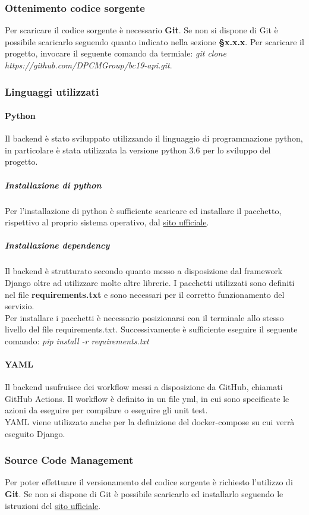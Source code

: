 \subsubsection{Ottenimento codice sorgente}
Per scaricare il codice sorgente è necessario \textbf{Git}. Se non si dispone di Git è possibile scaricarlo seguendo quanto indicato nella sezione \textbf{§x.x.x}. Per scaricare il progetto, invocare il seguente comando da termiale: \textit{git clone https://github.com/DPCMGroup/bc19-api.git}.

\subsubsection{Linguaggi utilizzati}
\paragraph{Python}
Il backend è stato sviluppato utilizzando il linguaggio di programmazione python, in particolare è stata utilizzata la versione python 3.6 per lo sviluppo del progetto.

\subparagraph{Installazione di python}
Per l'installazione di python è sufficiente scaricare ed installare il pacchetto, rispettivo al proprio sistema operativo, dal \href{https://www.python.org/downloads/}{sito ufficiale}.

\subparagraph{Installazione dependency}
Il backend è strutturato secondo quanto messo a disposizione dal framework Django oltre ad utilizzare molte altre librerie. I pacchetti utilizzati sono definiti nel file \textbf{requirements.txt} e sono necessari per il corretto funzionamento del servizio.\\
Per installare i pacchetti è necessario posizionarsi con il terminale allo stesso livello del file requirements.txt. Successivamente è sufficiente eseguire il seguente comando: \textit{pip install -r requirements.txt}

\paragraph{YAML}
Il backend usufruisce dei workflow messi a disposizione da GitHub, chiamati GitHub Actions. Il workflow è definito in un file yml, in cui sono specificate le azioni da eseguire per compilare o eseguire gli unit test.
\\YAML viene utilizzato anche per la definizione del docker-compose su cui verrà eseguito Django.

\subsubsection{Source Code Management}
Per poter effettuare il versionamento del codice sorgente è richiesto l'utilizzo di \textbf{Git}. Se non si dispone di Git è possibile scaricarlo ed installarlo seguendo le istruzioni del \href{https://git-scm.com/downloads}{sito ufficiale}.

